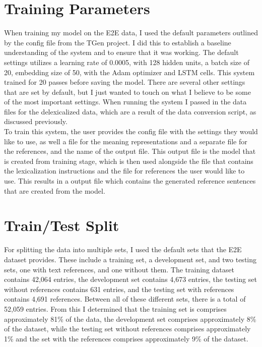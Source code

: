 \documentclass[12pt]{article}
\begin{document}
\section{Training Parameters}
When training my model on the E2E data, I used the default parameters outlined by the config file from the TGen project. I did this to establish a baseline understanding of the system and to ensure that it was working. The default settings utilizes a learning rate of 0.0005, with 128 hidden units, a batch size of 20, embedding size of 50, with the Adam optimizer and LSTM cells. This system trained for 20 passes before saving the model. There are several other settings that are set by default, but I just wanted to touch on what I believe to be some of the most important settings. When running the system I passed in the data files for the delexicalized data, which are a result of the data conversion script, as discussed previously. \\

To train this system, the user provides the config file with the settings they would like to use, as well a file for the meaning representations and a separate file for the references, and the name of the output file. This output file is the model that is created from training stage, which is then used alongside the file that contains the lexicalization instructions and the file for references the user would like to use. This results in a output file which contains the generated reference sentences that are created from the model. \\

\section{Train/Test Split}
For splitting the data into multiple sets, I used the default sets that the E2E dataset provides. These include a training set, a development set, and two testing sets, one with text references, and one without them. The training dataset contains 42,064 entries, the development set contains 4,673 entries, the testing set without references contains 631 entries, and the testing set with references contains 4,691 references. Between all of these different sets, there is a total of 52,059 entries. From this I determined that the training set is comprises approximately 81\% of the data, the development set comprises approximately 8\% of the dataset, while the testing set without references comprises approximately 1\% and the set with the references comprises approximately 9\% of the dataset. \\
\end{document}

